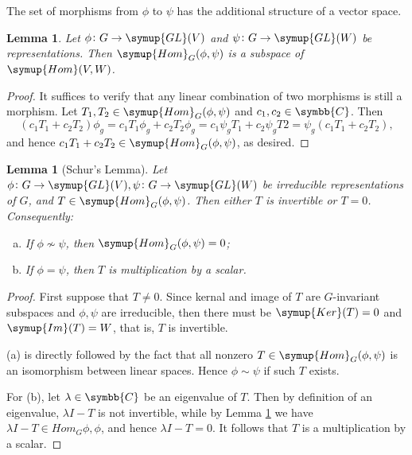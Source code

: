 \documentclass{assignment}[2019/10/15]
\theoremstyle{plain}
\newtheorem{lemma}[theorem]{Lemma}
\newcommand{\BC}{\symbb{C}}
\newcommand{\Kernal}{\mathop{}\!\symup{Ker}}
\newcommand{\Image}{\mathop{}\!\symup{Im}}
\newcommand{\Hom}{\mathop{}\!\symup{Hom}}
\newcommand{\GL}{\mathop{}\!\symup{GL}}
\numberwithin{equation}{section}
\begin{document}
    The set of morphisms from $\phi$ to $\psi$ has the additional structure of a vector space.

    \begin{lemma}\label{lem: hom-linear}
        Let $\phi\colon G\to \GL(V)$ and $\psi\colon G\to \GL(W)$ be representations. Then $\Hom_G(\phi, \psi)$ is a subspace of $\Hom(V, W)$.
    \end{lemma}

    \begin{proof}
        It suffices to verify that any linear combination of two morphisms is still a morphism. Let $T_1, T_2\in \Hom_G(\phi, \psi)$ and $c_1, c_2\in \BC$. Then
        \begin{equation}
            (c_1T_1+c_2T_2)\phi_g = c_1T_1\phi_g + c_2T_2\phi_g = c_1\psi_gT_1 + c_2\psi_gT2 = \psi_g(c_1T_1+c_2T_2),
        \end{equation}
        and hence $c_1T_1+c_2T_2\in\Hom_G(\phi, \psi)$, as desired.
    \end{proof}

    \begin{lemma}[Schur's Lemma]
        Let $\phi\colon G\to\GL(V), \psi\colon G\to\GL(W)$ be irreducible representations of $G$, and $T \in\Hom_G(\phi, \psi)$. Then either $T$ is invertible or $T=0$. Consequently:
        \begin{enumerate}[(a)]
            \item If $\phi\nsim\psi$, then $\Hom_G(\phi, \psi) = 0$;
            \item If $\phi= \psi$, then $T$ is multiplication by a scalar.
        \end{enumerate}
    \end{lemma}

    \begin{proof}
        First suppose that $T\neq 0$. Since kernal and image of $T$ are $G$-invariant subspaces and $\phi, \psi$ are irreducible, then there must be $\Kernal(T) = 0$ and $\Image(T) = W$, that is, $T$ is invertible.

        (a) is directly followed by the fact that all nonzero $T\in\Hom_G(\phi, \psi)$ is an isomorphism between linear spaces. Hence $\phi\sim\psi$ if such $T$ exists.

        For (b), let $\lambda\in \BC$ be an eigenvalue of $T$. Then by definition of an eigenvalue, $\lambda I-T$ is not invertible, while by Lemma \ref{lem: hom-linear} we have $\lambda I-T\in Hom_G{\phi, \phi}$, and hence $\lambda I - T=0$. It follows that $T$ is a multiplication by a scalar.
    \end{proof}
\end{document}
